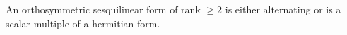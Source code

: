 An orthosymmetric sesquilinear form of rank $\geq 2$ is either alternating or is a scalar multiple of a hermitian form.
